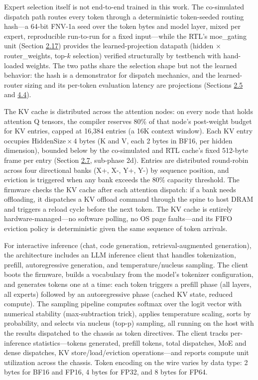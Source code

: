 \documentclass[10pt,twocolumn]{article}
\begin{document}
Expert selection itself is not end-to-end trained in this work. The co-simulated dispatch path routes every token through a deterministic token-seeded routing hash---a 64-bit FNV-1a seed over the token bytes and model layer, mixed per expert, reproducible run-to-run for a fixed input---while the RTL's moe\_gating unit (Section \hyperref[sec:2.17]{2.17}) provides the learned-projection datapath (hidden $\times$ router\_weights, top-$k$ selection) verified structurally by testbench with hand-loaded weights. The two paths share the selection shape but not the learned behavior: the hash is a demonstrator for dispatch mechanics, and the learned-router sizing and its per-token evaluation latency are projections (Sections \hyperref[sec:2.5]{2.5} and \hyperref[sec:4.4]{4.4}).

The KV cache is distributed across the attention nodes: on every node that holds attention Q tensors, the compiler reserves 80\% of that node's post-weight budget for KV entries, capped at 16,384 entries (a 16K context window). Each KV entry occupies $\mathrm{HiddenSize} \times 4$ bytes (K and V, each 2 bytes in BF16, per hidden dimension), bounded below by the co-simulated and RTL cache's fixed 512-byte frame per entry (Section \hyperref[sec:2.7]{2.7}, sub-phase 2d). Entries are distributed round-robin across four directional banks (X+, X-, Y+, Y-) by sequence position, and eviction is triggered when any bank exceeds the 80\% capacity threshold. The firmware checks the KV cache after each attention dispatch: if a bank needs offloading, it dispatches a KV offload command through the spine to host DRAM and triggers a reload cycle before the next token. The KV cache is entirely hardware-managed---no software polling, no OS page faults---and its FIFO eviction policy is deterministic given the same sequence of token arrivals.

For interactive inference (chat, code generation, retrieval-augmented generation), the architecture includes an LLM inference client that handles tokenization, prefill, autoregressive generation, and temperature/nucleus sampling. The client boots the firmware, builds a vocabulary from the model's tokenizer configuration, and generates tokens one at a time: each token triggers a prefill phase (all layers, all experts) followed by an autoregressive phase (cached KV state, reduced compute). The sampling pipeline computes softmax over the logit vector with numerical stability (max-subtraction trick), applies temperature scaling, sorts by probability, and selects via nucleus (top-p) sampling, all running on the host with the results dispatched to the chassis as token directives. The client tracks per-inference statistics---tokens generated, prefill tokens, total dispatches, MoE and dense dispatches, KV store/load/eviction operations---and reports compute unit utilization across the chassis. Token encoding on the wire varies by data type: 2 bytes for BF16 and FP16, 4 bytes for FP32, and 8 bytes for FP64.
\end{document}
